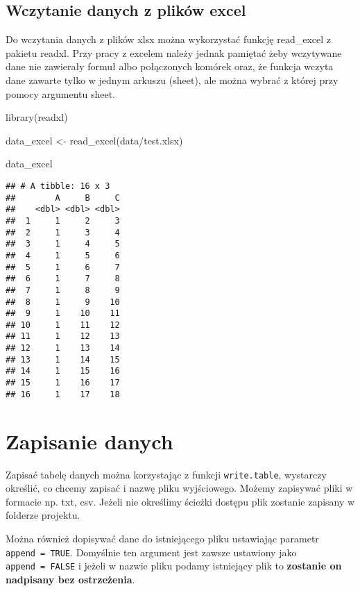\documentclass[
]{book}
\newenvironment{Shaded}{\begin{snugshade}}{\end{snugshade}}
\newcommand{\FunctionTok}[1]{\textcolor[rgb]{0.00,0.00,0.00}{#1}}
\newcommand{\NormalTok}[1]{#1}
\newcommand{\OtherTok}[1]{\textcolor[rgb]{0.56,0.35,0.01}{#1}}
\newcommand{\StringTok}[1]{\textcolor[rgb]{0.31,0.60,0.02}{#1}}
\begin{document}
\hypertarget{wczytanie-danych-z-plikuxf3w-excel}{%
\subsection{Wczytanie danych z plików excel}\label{wczytanie-danych-z-plikuxf3w-excel}}

Do wczytania danych z plików xlsx można wykorzystać funkcję read\_excel z pakietu readxl. Przy pracy z excelem należy jednak pamiętać żeby wczytywane dane nie zawierały formuł albo połączonych komórek oraz, że funkcja wczyta dane zawarte tylko w jednym arkuszu (sheet), ale można wybrać z której przy pomocy argumentu sheet.

\begin{Shaded}
\begin{Highlighting}[]
\FunctionTok{library}\NormalTok{(readxl)}

\NormalTok{data\_excel }\OtherTok{\textless{}{-}} \FunctionTok{read\_excel}\NormalTok{(}\StringTok{\textquotesingle{}data/test.xlsx\textquotesingle{}}\NormalTok{)}

\NormalTok{data\_excel}
\end{Highlighting}
\end{Shaded}

\begin{verbatim}
## # A tibble: 16 x 3
##        A     B     C
##    <dbl> <dbl> <dbl>
##  1     1     2     3
##  2     1     3     4
##  3     1     4     5
##  4     1     5     6
##  5     1     6     7
##  6     1     7     8
##  7     1     8     9
##  8     1     9    10
##  9     1    10    11
## 10     1    11    12
## 11     1    12    13
## 12     1    13    14
## 13     1    14    15
## 14     1    15    16
## 15     1    16    17
## 16     1    17    18
\end{verbatim}

\hypertarget{zapisanie-danych}{%
\section{Zapisanie danych}\label{zapisanie-danych}}

Zapisać tabelę danych można korzystając z funkcji \texttt{write.table}, wystarczy określić, co chcemy zapisać i nazwę pliku wyjściowego. Możemy zapisywać pliki w formacie np. txt, csv. Jeżeli nie określimy ścieżki dostępu plik zostanie zapisany w folderze projektu.

Można również dopisywać dane do istniejącego pliku ustawiając parametr \texttt{append\ =\ TRUE}. Domyślnie ten argument jest zawsze ustawiony jako \texttt{append\ =\ FALSE} i jeżeli w nazwie pliku podamy istniejący plik to \textbf{zostanie on nadpisany bez ostrzeżenia}.
\end{document}

